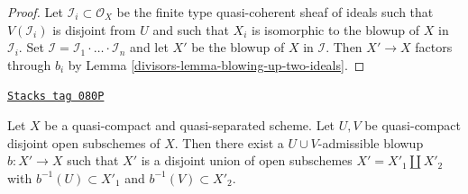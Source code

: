 \begin{proof}

Let $\mathcal{I}_i \subset \mathcal{O}_X$ be the finite type
quasi-coherent sheaf of ideals such that $V(\mathcal{I}_i)$ is
disjoint from $U$ and such that $X_i$ is isomorphic to the
blowup of $X$ in $\mathcal{I}_i$. Set
$\mathcal{I} = \mathcal{I}_1 \cdot \ldots \cdot \mathcal{I}_n$
and let $X'$ be the blowup of $X$ in $\mathcal{I}$. Then
$X' \to X$ factors through $b_i$ by Lemma \ref{divisors-lemma-blowing-up-two-ideals}.
\end{proof}

\begin{lemma}
\label{divisors-lemma-separate-disjoint-opens-by-blowing-up}
\href{https://stacks.math.columbia.edu/tag/080P}{\texttt{Stacks tag 080P}}


Let $X$ be a quasi-compact and quasi-separated scheme.
Let $U, V$ be quasi-compact disjoint open subschemes of $X$.
Then there exist a $U \cup V$-admissible blowup $b : X' \to X$
such that $X'$ is a disjoint union of open subschemes
$X' = X'_1 \amalg X'_2$ with $b^{-1}(U) \subset X'_1$ and
$b^{-1}(V) \subset X'_2$.
\end{lemma}

